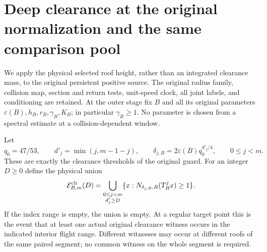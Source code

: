 \section{Deep clearance at the original normalization and the same comparison pool}
\label{sec:lc-normalized}

We apply the physical selected roof height, rather than an integrated
clearance mass, to the original persistent positive source.  The original
radius family, collision map, section and return tests, unit-speed clock,
all joint labels, and conditioning are retained.  At the outer stage fix
$B$ and all its original parameters
$\varepsilon(B),h_B,r_B,\gamma_B,K_B$; in particular
$\gamma_B\ge1$.  No parameter is chosen from a spectral estimate at a
collision-dependent window.

Let
\begin{equation}\label{eq:lc-original-depths}
 q_0=47/53,\qquad d'_j=\min(j,m-1-j),\qquad
 \delta_{j,B}=2\varepsilon(B)q_0^{d'_j/4},\qquad 0\le j<m.
\end{equation}
These are exactly the clearance thresholds of the original guard.
For an integer $D\ge0$ define the physical union
\begin{equation}\label{eq:lc-deep-event}
 \mathcal E^{\rm clr}_{B,m}(D)
   =\bigcup_{\substack{0\le j<m\\d'_j\ge D}}
          \{x:N_{\delta_{j,B},R}(T_R^jx)\ge1\}.
\end{equation}
If the index range is empty, the union is empty.  At a regular target
point this is the event that at least one actual original clearance
witness occurs in the indicated interior flight range.  Different
witnesses may occur at different roofs of the same paired segment;
no common witness on the whole segment is required.

